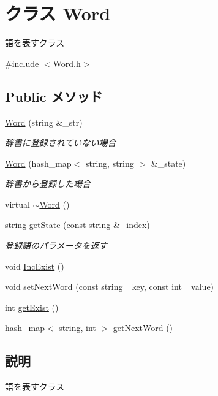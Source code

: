 \hypertarget{class_word}{\section{クラス Word}
\label{class_word}
}


語を表すクラス  




{\ttfamily \#include $<$Word.\-h$>$}

\subsection*{Public メソッド}
\begin{DoxyCompactItemize}
\item 
\hyperlink{class_word_a9dd554bf5175a175c083cbda6eba20be}{Word} (string \&\-\_\-str)
\begin{DoxyCompactList}\small\item\em 辞書に登録されていない場合 \end{DoxyCompactList}\item 
\hyperlink{class_word_aa88a96c8973a3d7b99cd6afeb8ce4475}{Word} (hash\-\_\-map$<$ string, string $>$ \&\-\_\-state)
\begin{DoxyCompactList}\small\item\em 辞書から登録した場合 \end{DoxyCompactList}\item 
virtual \hyperlink{class_word_a1fbcaae6859604d92e94cab540cb3523}{$\sim$\-Word} ()
\item 
string \hyperlink{class_word_ab7887831bc0823ce7af3a1139ab0d3b2}{get\-State} (const string \&\-\_\-index)
\begin{DoxyCompactList}\small\item\em 登録語のパラメータを返す \end{DoxyCompactList}\item 
void \hyperlink{class_word_a0aaa41af2a89d03547f8b3cd08933cc8}{Inc\-Exist} ()
\item 
void \hyperlink{class_word_a6a470d7a709085c6ba2e0d752555d12f}{set\-Next\-Word} (const string \-\_\-key, const int \-\_\-value)
\item 
int \hyperlink{class_word_ab9fc7597dcb1da37f9169f70b2466884}{get\-Exist} ()
\item 
hash\-\_\-map$<$ string, int $>$ \hyperlink{class_word_a84f032647fe603885e0abf145cbbc8f9}{get\-Next\-Word} ()
\end{DoxyCompactItemize}


\subsection{説明}
語を表すクラス 

